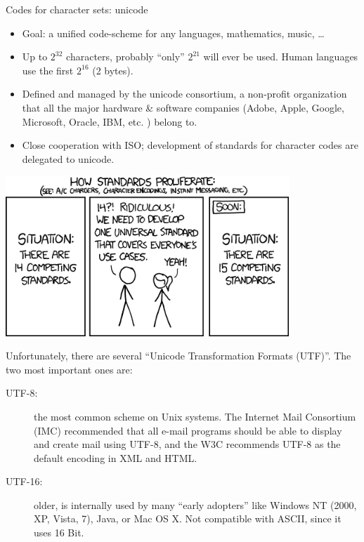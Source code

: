 \begin{vbframe}{Codes for character sets: unicode}
\begin{itemize}
\item Goal: a unified code-scheme for any
  languages, mathematics, music, \ldots
\item Up to $2^{32}$ characters, probably \enquote{only}
  $2^{21}$ will ever be used. Human languages use the
  first $2^{16}$ (2 bytes).
\item Defined and managed by the unicode consortium, a non-profit organization that
  all the major hardware \& software companies (Adobe, Apple, Google,
  Microsoft, Oracle, IBM, etc. ) belong to.\\


\item Close cooperation with ISO; development of standards for
  character codes are delegated to unicode.
\end{itemize}

\framebreak

  \begin{center}
    \includegraphics[width=0.8\textwidth]{figure_man/standards.png}
  \end{center}

\framebreak

Unfortunately, there are several \enquote{Unicode Transformation Formats (UTF)}.
The two most important ones are:
\begin{description}
\item[UTF-8:] the most common scheme on Unix systems. The Internet Mail Consortium (IMC) recommended that all e-mail programs should be able to display and create mail using UTF-8, and the W3C recommends UTF-8 as the default encoding in XML and HTML. 
\item[UTF-16:] older, is internally used by many \enquote{early adopters} like
  Windows NT (2000, XP, Vista, 7), Java, or Mac OS X. Not
  compatible with ASCII, since it uses 16 Bit.
\end{description}


\end{vbframe}
